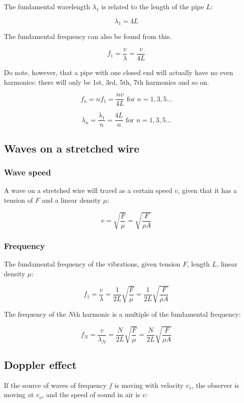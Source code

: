 \documentclass[12pt]{article}
\begin{document}
The fundamental wavelength $\lambda_1$ is related to the length of the pipe $L$:

\[
\boxed{
\lambda_1 = 4L
}
\]

The fundamental frequency can also be found from this.

\[
\boxed{
f_1 = \frac{v}{\lambda} = \frac{v}{4L}
}
\]

Do note, however, that a pipe with one closed end will actually have no even harmonics: there will only be 1st, 3rd, 5th, 7th harmonics and so on.

\[
\boxed{
f_n = nf_1 = \frac{nv}{4L}\text{ for }n = 1,3,5...
}
\]

\[
\boxed{
\lambda_n = \frac{\lambda_1}{n} = \frac{4L}{n}\text{ for }n = 1,3,5...
}
\]

\subsection{Waves on a stretched wire}

\subsubsection{Wave speed}

A wave on a stretched wire will travel as a certain speed $v$, given that it has a tension of $F$ and a linear density $\mu$:

\[
\boxed{
v = \sqrt{\frac{F}{\mu}} = \sqrt{\frac{F}{\rho A}}
}
\]

\subsubsection{Frequency}

The fundamental frequency of the vibrations, given tension $F$, length $L$, linear density $\mu$:

\[
\boxed{
f_1 = \frac{v}{\lambda} = \frac{1}{2L} \sqrt{\frac{F}{\mu}} = \frac{1}{2L} \sqrt{\frac{F}{\rho A}}
}
\]

The frequency of the $N$th harmonic is a multiple of the fundamental frequency:

\[
\boxed{
f_N = \frac{v}{\lambda_N} = \frac{N}{2L} \sqrt{\frac{F}{\mu}} = \frac{N}{2L} \sqrt{\frac{F}{\rho A}}
}
\]

\subsection{Doppler effect}

If the source of waves of frequency $f$ is moving with velocity $v_s$, the observer is moving at $v_o$, and the speed of sound in air is $v$:
\end{document}

